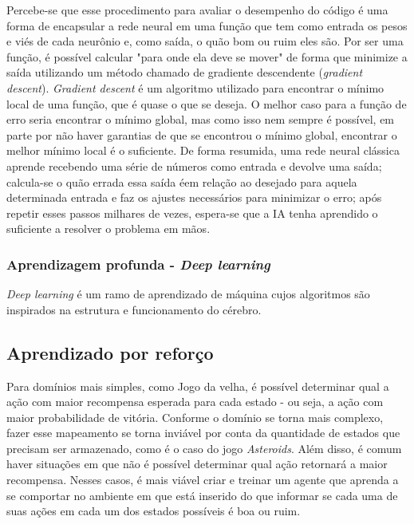 Percebe-se que esse procedimento para avaliar o desempenho do código é uma forma de encapsular a rede neural em uma função que tem como entrada os pesos e viés de cada neurônio e, como saída, o quão bom ou ruim eles são. Por ser uma função, é possível calcular "para onde ela deve se mover" de forma que minimize a saída utilizando um método chamado de gradiente descendente (\textit{gradient descent}). \textit{Gradient descent} é um algoritmo utilizado para encontrar o mínimo local de uma função, que é quase o que se deseja. O melhor caso para a função de erro seria encontrar o mínimo global, mas como isso nem sempre é possível, em parte por não haver garantias de que se encontrou o mínimo global, encontrar o melhor mínimo local é o suficiente.
De forma resumida, uma rede neural clássica aprende recebendo uma série de números como entrada e devolve uma saída; calcula-se o quão errada essa saída éem relação ao desejado para aquela determinada entrada e faz os ajustes necessários para minimizar o erro; após repetir esses passos milhares de vezes, espera-se que a IA tenha aprendido o suficiente a resolver o problema em mãos.

\subsubsection{Aprendizagem profunda - \textit{Deep learning}}
\label{sec:dl}


\textit{Deep learning} é um ramo de aprendizado de máquina cujos algoritmos são inspirados na estrutura e funcionamento do cérebro.

\subsection{Aprendizado por reforço}
\label{sec:rl}

Para domínios mais simples, como Jogo da velha, é possível determinar qual a ação com maior recompensa esperada para cada estado - ou seja, a ação com maior probabilidade de vitória.
Conforme o domínio se torna mais complexo, fazer esse mapeamento se torna inviável por conta da quantidade de estados que precisam ser armazenado, como é o caso do jogo \textit{Asteroids}. Além disso, é comum haver situações em que não é possível determinar qual ação retornará a maior recompensa.
Nesses casos, é mais viável criar e treinar um agente que aprenda a se comportar no ambiente em que está inserido do que informar se cada uma de suas ações em cada um dos estados possíveis é boa ou ruim.


